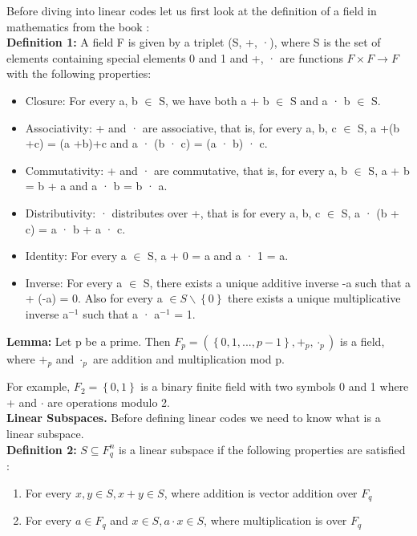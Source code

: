 Before diving into linear codes let us first look at the definition of a field in mathematics from the book \cite{chap2}:\\
\textbf{Definition 1:} A field F is given by a triplet (S, +, ·), where S is the set of elements containing
special elements 0 and 1 and +, · are functions $F \times F \rightarrow F$ with the following properties:
\begin{itemize}\itemsep-\the\parsep
	\item Closure: For every a, b $\in$ S, we have both a + b $\in$ S and a · b $\in$ S.
	\item Associativity: + and · are associative, that is, for every a, b, c $\in$ S, a +(b +c) = (a +b)+c and a · (b · c) = (a · b) · c.
	\item Commutativity: + and · are commutative, that is, for every a, b $\in$ S, a + b = b + a and a · b = b · a.
	\item Distributivity: · distributes over +, that is for every a, b, c $\in$ S, a · (b + c) = a · b + a · c.
	\item Identity: For every a $\in$ S, a + 0 = a and a · 1 = a.
	\item Inverse: For every a $\in$ S, there exists a unique additive inverse -a such that a + (-a) = 0. Also for every a $\in S \backslash \left\{0\right\}$ there exists a unique multiplicative inverse a$^{-1}$ such that a · a$^{-1}$ = 1.
\end{itemize}

\textbf{Lemma:} Let p be a prime. Then $F_p = (\left\{0, 1, . . . , p - 1\right\}, +_p , \cdot_p )$ is a field, where $+_p$ and $\cdot_p$ are
addition and multiplication mod p. \cite{chap2}

For example, $F_2 = \left\{0,1\right\}$ is a binary finite field with two symbols 0 and 1 where + and $\cdot$ are operations modulo 2.\\

\textbf{Linear Subspaces.} Before defining linear codes we need to know what is a linear subspace.\\
\textbf{Definition 2:} $ S \subseteq F_q^n $ is a linear subspace if the following properties are satisfied \cite{chap2}:
\begin{enumerate}
	\item For every $x,y \in S, x+y \in S$, where addition is vector addition over $F_q$
	\item For every $a \in F_q$ and $x \in S, a\cdot x\in S$, where multiplication is over $F_q$
\end{enumerate}

